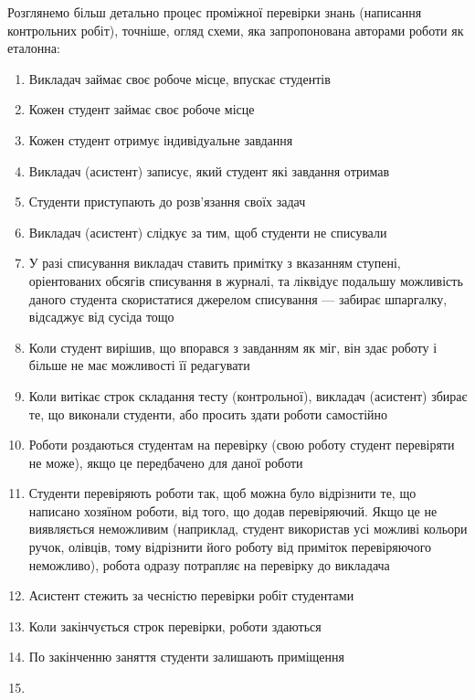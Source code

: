 Розглянемо більш детально процес проміжної перевірки знань (написання
контрольних робіт), точніше, огляд схеми, яка запропонована авторами
роботи як еталонна:

\begin{enumerate}
    \item
        Викладач займає своє робоче місце, впускає студентів
    \item
        Кожен студент займає своє робоче місце
    \item
        Кожен студент отримує індивідуальне завдання
    \item
        Викладач (асистент) записує, який студент які завдання отримав
    \item
        Студенти приступають до розв’язання своїх задач
    \item
        Викладач (асистент) слідкує за тим, щоб студенти не списували
    \item
        У разі списування викладач ставить примітку з вказанням ступені,
        оріентованих обсягів списування в журналі, та ліквідує подальшу
        можливість даного студента скористатися джерелом списування --- забирає
        шпаргалку, відсаджує від сусіда тощо
    \item
        Коли студент вирішив, що впорався з завданням як міг, він здає роботу
        і більше не має можливості її редагувати
    \item
        Коли витікає строк складання тесту (контрольної), викладач (асистент)
        збирає те, що виконали студенти, або просить здати роботи самостійно
    \item
        Роботи роздаються студентам на перевірку (свою роботу студент перевіряти
        не може), якщо це передбачено для даної роботи
    \item
        Студенти перевіряють роботи так, щоб можна було відрізнити те, що
        написано хозяїном роботи, від того, що додав перевіряючий. Якщо це не
        виявляється неможливим (наприклад, студент використав усі можливі
        кольори ручок, олівців, тому відрізнити його роботу від приміток
        перевіряючого неможливо), робота одразу потрапляє на перевірку до
        викладача
    \item
        Асистент стежить за чесністю перевірки робіт студентами
    \item
        Коли закінчується строк перевірки, роботи здаються
    \item
        По закінченню заняття студенти залишають приміщення
    \item

\end{enumerate}

